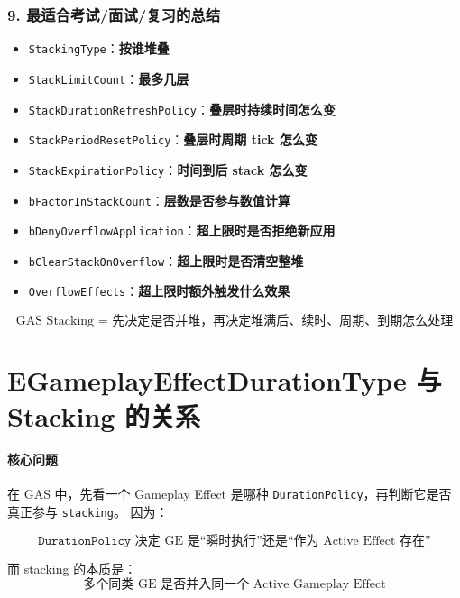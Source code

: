 \documentclass[CJKmath=true,10pt]{MyBook}
\begin{document}
\subsubsection{9. 最适合考试/面试/复习的总结}

\begin{itemize}
	\item \texttt{StackingType}：\textbf{按谁堆叠}
	\item \texttt{StackLimitCount}：\textbf{最多几层}
	\item \texttt{StackDurationRefreshPolicy}：\textbf{叠层时持续时间怎么变}
	\item \texttt{StackPeriodResetPolicy}：\textbf{叠层时周期 tick 怎么变}
	\item \texttt{StackExpirationPolicy}：\textbf{时间到后 stack 怎么变}
	\item \texttt{bFactorInStackCount}：\textbf{层数是否参与数值计算}
	\item \texttt{bDenyOverflowApplication}：\textbf{超上限时是否拒绝新应用}
	\item \texttt{bClearStackOnOverflow}：\textbf{超上限时是否清空整堆}
	\item \texttt{OverflowEffects}：\textbf{超上限时额外触发什么效果}
\end{itemize}

\[
\boxed{
	\text{GAS Stacking = 先决定是否并堆，再决定堆满后、续时、周期、到期怎么处理}
}
\]


\section{EGameplayEffectDurationType 与 Stacking 的关系}

\paragraph{核心问题}
在 GAS 中，先看一个 Gameplay Effect 是哪种 \texttt{DurationPolicy}，再判断它是否真正参与 \texttt{stacking}。  
因为：

\[
\boxed{
	\texttt{DurationPolicy} \text{ 决定 GE 是“瞬时执行”还是“作为 Active Effect 存在”}
}
\]

而 stacking 的本质是：  
\[
\boxed{
	\text{多个同类 GE 是否并入同一个 Active Gameplay Effect}
}
\]
\end{document}
